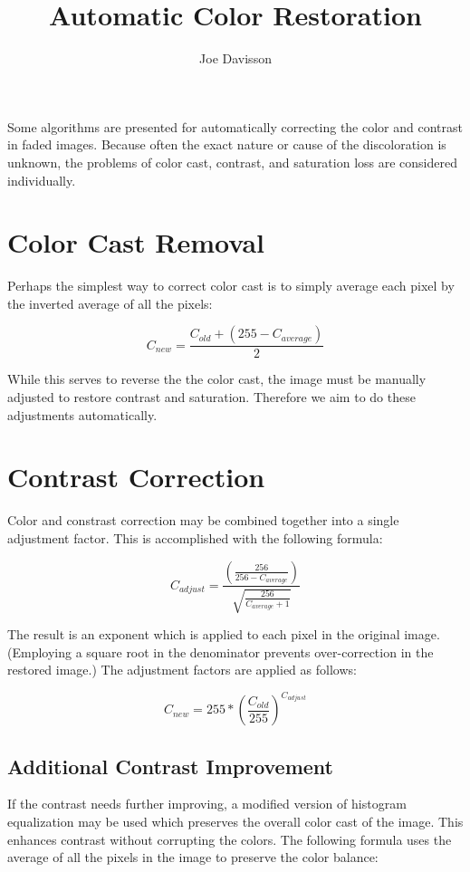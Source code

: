\documentclass{article}
\title{Automatic Color Restoration}
\author{Joe Davisson} %
\begin{document}
\maketitle

Some algorithms are presented for automatically correcting the
color and contrast in faded images. Because often the exact nature or cause
of the discoloration is unknown, the problems of color cast, contrast, and
saturation loss are considered individually.

\section{Color Cast Removal}
Perhaps the simplest way to correct color cast is to simply average each
pixel by the inverted average of all the pixels:

\[ C_{new} = \frac{C_{old} + \left(255 - C_{average}\right) }{2} \]

While this serves to reverse the the color cast, the image must be manually
adjusted to restore contrast and saturation. Therefore we aim to do these
adjustments automatically.

\section{Contrast Correction}
Color and constrast correction may be combined together into a single
adjustment factor. This is accomplished with the following formula:

\[ C_{adjust} = \frac{\left(\frac{256} {256 - C_{average}}\right)}
                     {\sqrt{\frac{256} { C_{average} + 1}}} \]

The result is an exponent which is applied to each pixel in the original image.
(Employing a square root in the denominator prevents over-correction in the
restored image.) The adjustment factors are applied as follows:

\[ C_{new} = 255 * \left(\frac{C_{old}}{255}\right) ^ {C_{adjust}} \]

\subsection{Additional Contrast Improvement}
If the contrast needs further improving, a modified version of histogram
equalization may be used which preserves the overall color cast of the image.
This enhances contrast without corrupting the colors. The following formula
uses the average of all the pixels in the image to preserve the color balance: 
\end{document}
